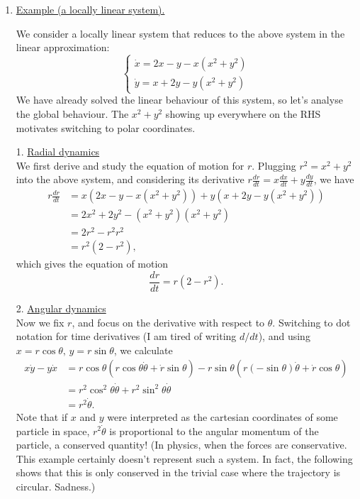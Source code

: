 \documentclass[11pt, letterpaper, oneside]{article}     %
\numberwithin{equation}{subsection}
\theoremstyle{definition}
\numberwithin{theorem}{section}
\theoremstyle{remark}
\newcommand{\ds}{\displaystyle}
\begin{document}
\begin{enumerate}
  \medskip

\item \underline{Example (a locally linear system).}

  We consider a locally linear system that reduces to the above system in the linear approximation:
  \begin{equation}
    \begin{cases}
      \dot x = 2x-y - x(x^2 + y^2)\\
      \dot y = x+2y - y(x^2 + y^2)
    \end{cases}
  \end{equation}
  We have already solved the linear behaviour of this system, so let's analyse the global behaviour. The $x^2 + y^2$ showing up everywhere on the RHS motivates switching to polar coordinates.

  1. \underline{Radial dynamics}\\
  We first derive and study the equation of motion for $r$. Plugging $r^2 = x^2 + y^2$ into the above system, and considering its derivative $\ds r\frac{dr}{dt} = x\frac{dx}{dt} + y\frac{dy}{dt}$, we have
  \begin{equation}
    \begin{split}
      r\frac{dr}{dt} &= x(2x-y - x(x^2+y^2)) + y(x+2y-y(x^2+y^2))\\
      &= 2x^2 + 2y^2 - (x^2+y^2)(x^2+y^2)\\
      &= 2r^2 - r^2r^2\\
      &= r^2(2-r^2),
    \end{split}
  \end{equation}
  which gives the equation of motion
  \begin{equation}
    \frac{dr}{dt} = r(2-r^2).
  \end{equation}

  2. \underline{Angular dynamics}\\
  Now we fix $r$, and focus on the derivative with respect to $\theta$. Switching to dot notation for time derivatives (I am tired of writing $d/dt$), and using $x = r\cos\theta,\,y = r\sin\theta$, we calculate
  \begin{equation}\label{eq:angular-dynamics1}
    \begin{split}
      x\dot y - y\dot x &= r\cos\theta\left(r\cos\theta \dot\theta + \dot r\sin\theta\right) - r\sin\theta\left(r(-\sin\theta)\dot\theta + \dot r\cos\theta\right)\\
      &= r^2\cos^2\theta\dot\theta + r^2\sin^2\theta\dot\theta\\
      &= r^2\dot\theta.
    \end{split}
  \end{equation}
  Note that if $x$ and $y$ were interpreted as the cartesian coordinates of some particle in space, $r^2\dot\theta$ is proportional to the angular momentum of the particle, a conserved quantity! (In physics, when the forces are conservative. This example certainly doesn't represent such a system. In fact, the following shows that this is only conserved in the trivial case where the trajectory is circular. Sadness.)


\end{enumerate}
\end{document}
